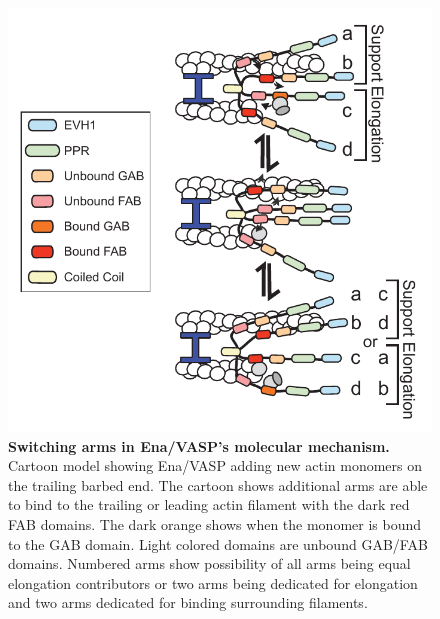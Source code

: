 \begin{figure}
\centering
\includegraphics[width=15cm]{img/ch05/thesis_mech.pdf}
\caption[Switching arms in Ena/VASP's molecular mechanism.]{\textbf{Switching arms in Ena/VASP's molecular mechanism.} Cartoon model showing Ena/VASP adding new actin monomers on the trailing barbed end.  The cartoon shows additional arms are able to bind to the trailing or leading actin filament with the dark red FAB domains. The dark orange shows when the monomer is bound to the GAB domain. Light colored domains are unbound GAB/FAB domains.  Numbered arms show possibility of all arms being equal elongation contributors or two arms being dedicated for elongation and two arms dedicated for binding surrounding filaments. }
\label{fig:switching-mech}
\end{figure}

